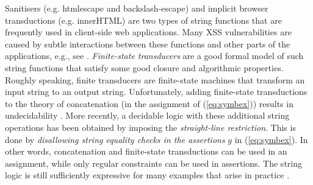 
Sanitisers (e.g. htmlescape and backslash-escape)
and implicit browser transductions (e.g. innerHTML)
are two types of string functions that are frequently used in client-side
web applications. Many XSS vulnerabilities are caused by
subtle interactions between these functions and other parts of the
applications, e.g., see \cite{web-model,Kern14,DV13,LB16,mXSS}. 
\emph{Finite-state transducers} 
\cite{BEK,web-model,DV13,symbolic-transducer,LB16}
are a good formal model of such string functions that satisfy some
good closure and algorithmic properties. 
Roughly speaking, finite transducers are
finite-state machines that transform an input string to an output string. 
Unfortunately, adding finite-state transductions to
the theory of concatenation (in the assignment of (\ref{eq:symbex})) results in 
undecidability \cite{LB16}.
More recently, a decidable logic with these additional string 
operations \cite{LB16} has been obtained by imposing 
the \emph{straight-line restriction}. %
This is done 
by \emph{disallowing string equality checks in the assertions} $g$ in 
(\ref{eq:symbex}). In other words, concatenation and finite-state transductions
can be used in an assignment, while only regular constraints can be used in
assertions. The string logic is still 
sufficiently expressive
for many examples that arise in practice \cite{LB16,HJLRV18}.




